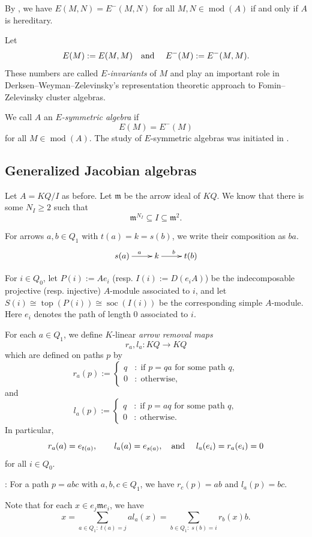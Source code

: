 \documentclass[12pt,reqno]{amsart}
\theoremstyle{definition}
\newcommand{\Example}{\noindent{\bf Example}}
\newcommand{\df}{\colon}
\newcommand{\m}{\mathfrak{m}}
\newcommand{\md}{\operatorname{mod}}
\newcommand{\soc}{\operatorname{soc}}
\newcommand{\tp}{\operatorname{top}}
\begin{document}
By \cite[Proposition~1.5]{BS26}, we have
$E(M,N) = E^-(M,N)$ for all $M,N \in \md(A)$ if and only if $A$ is hereditary.

 
Let
$$
E(M) := E(M,M) \text{\quad and \quad}
E^-(M) := E^-(M,M).
$$
These numbers are called \emph{$E$-invariants} of $M$ and
play an important role in Derksen--Weyman--Zelevinsky's
\cite{DWZ08, DWZ10} representation theoretic approach to 
Fo\-min--Zelevinsky cluster algebras.

We call $A$ an \emph{$E$-symmetric algebra}
if $$
E(M) = E^-(M)
$$ 
for all $M \in \md(A)$. 
The study of $E$-symmetric algebras was initiated in \cite{BS26}.

\subsection{Generalized Jacobian algebras}\label{subsec:1.2}
Let $A = KQ/I$ as before. 
Let $\m$ be the arrow ideal of $KQ$.
We know that there is some $N_I \ge 2$ such that
$$
\m^{N_I} \subseteq I \subseteq \m^2.
$$

For arrows $a,b \in Q_1$ with $t(a) = k = s(b)$, we write their composition
as $ba$.
$$
\xymatrix{
s(a) \ar[r]^a  & k \ar[r]^b & t(b)
}
$$

For $i \in Q_0$, let $P(i) := Ae_i$ (resp. $I(i) := D(e_iA)$) be the indecomposable projective (resp. injective) $A$-module associated to $i$, and let $S(i) \cong \tp(P(i)) \cong \soc(I(i))$ be the corresponding simple
$A$-module.
Here $e_i$ denotes the path of length $0$ associated to $i$.


For each $a \in Q_1$, we define $K$-linear \emph{arrow removal maps} 
$$
r_a, l_a\df KQ \to KQ
$$ 
which are defined on
paths $p$ by
$$
r_a(p) :=
 \begin{cases}
 q&:\;  \text{if $p = qa$ for some path $q$},
\\
0 &:\;  \text{otherwise},
\end{cases}
$$
and
$$
l_a(p) :=
 \begin{cases}
 q&:\; \text{if $p=aq$ for some path $q$},
\\
0&:\;  \text{otherwise}.
 \end{cases}
$$
In particular,
\[
r_a(a) = e_{t(a)},\qquad 
l_a(a)=e_{s(a)},
\text{\quad and \quad} l_a(e_i) = r_a(e_i) = 0
\]
for all $i \in Q_0$.

\Example:
For a path $p = abc$ with $a,b,c \in Q_1$, we have $r_c(p) = ab$ and $l_a(p) = bc$.


Note that
for each $x \in e_j \m e_i$, we have  
$$
x = \sum_{a \in Q_1 : \; t(a) = j}  al_a(x)
= \sum_{b \in Q_1 : \; s(b) = i}  r_b(x)b.
$$
\end{document}
